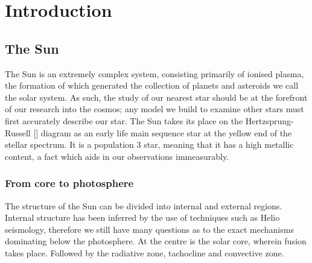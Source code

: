 
\newcommand{\pd}[2]{\frac{\partial #1}{\partial #2 }}
\newcommand{\td}[2]{\frac{d #1}{d #2 }}
\newcommand{\mb}[1]{\mathbf{#1}}
\newcommand{\divv}[1]{\bigtriangledown{#1}}
\newcommand{\del}{\bigtriangledown}

\label{ch:Intro}
\chapter{Introduction}  %





\section{The Sun}
The Sun is an extremely complex system, consisting primarily of ionised plasma, the formation of which generated the collection of planets and asteroids we call the solar system.
As such, the study of our nearest star should be at the forefront of our research into the cosmos; any model we build to examine other stars must first accurately describe our star. 
The Sun takes its place on the Hertzsprung-Russell [\cite{Hertzsprung1909, Russell1914}] diagram as an early life main sequence star at the yellow end of the stellar spectrum.
It is a population 3 star, meaning that it has a high metallic content, a fact which aids in our observations immeasurably.

\subsection{From core to photosphere}

The structure of the Sun can be divided into internal and external regions.
Internal structure has been inferred by the use of techniques such as Helio seismology, therefore we still have many questions as to the exact mechanisms dominating below the photosphere.
At the centre is the solar core, wherein fusion takes place. 
Followed by the radiative zone, tachocline and convective zone.

